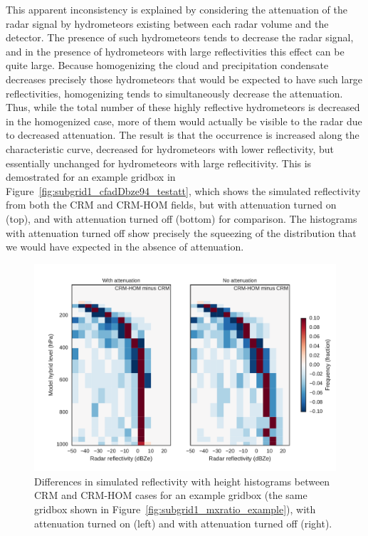 This apparent inconsistency is explained by considering the attenuation
of the radar signal by hydrometeors existing between each radar volume
and the detector. The presence of such hydrometeors tends to decrease
the radar signal, and in the presence of hydrometeors with large
reflectivities this effect can be quite large. Because homogenizing the
cloud and precipitation condensate decreases precisely those
hydrometeors that would be expected to have such large reflectivities,
homogenizing tends to simultaneously decrease the attenuation. Thus,
while the total number of these highly reflective hydrometeors is
decreased in the homogenized case, more of them would actually be
visible to the radar due to decreased attenuation. The result is that
the occurrence is increased along the characteristic curve, decreased
for hydrometeors with lower reflectivity, but essentially unchanged for
hydrometeors with large reflecitivity. This is demostrated for an
example gridbox in Figure~\ref{fig:subgrid1_cfadDbze94_testatt}, which
shows the simulated reflectivity from both the CRM and CRM-HOM fields,
but with attenuation turned on (top), and with attenuation turned off
(bottom) for comparison. The histograms with attenuation turned off show
precisely the squeezing of the distribution that we would have expected
in the absence of attenuation.

\begin{figure}[htbp]
\centering
\includegraphics{graphics/subgrid1_cfadDbze94_att-test.pdf}
\caption{\label{fig:subgrid1_cfadDbze94_testatt}Differences in simulated
reflectivity with height histograms between CRM and CRM-HOM cases for an
example gridbox (the same gridbox shown in
Figure~\ref{fig:subgrid1_mxratio_example}), with attenuation turned on
(left) and with attenuation turned off
(right).}\label{fig:subgrid1ux5fcfadDbze94ux5ftestatt}
\end{figure}

